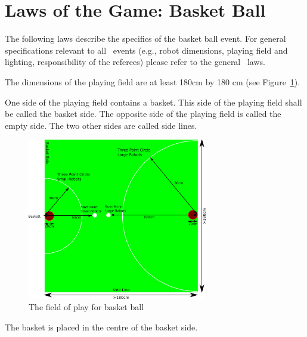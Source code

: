 \documentclass[12pt]{hurocup}
\begin{document}
\section{Laws of the Game: Basket Ball}
\label{sec:basket-ball-laws}

The following laws describe the specifics of the basket ball
event. For general specifications relevant to all \HuroCup\ events
(e.g., robot dimensions, playing field and lighting, responsibility of
the referees) please refer to the general \HuroCup\ laws.

\label{bb-field}

\begin{lawlist}[BB]

\item The dimensions of the playing field are at least 180cm by
  180 cm (see Figure~\ref{fig:field-basket-ball}).

\item One side of the playing field contains a basket. This side of the
  playing field shall be called the basket side. The opposite side of
  the playing field is called the empty side. The two other sides are
  called side lines.

  \begin{figure}
    \begin{center}
      \includegraphics[width=0.7\textwidth]{Figures/basket-ball}
    \end{center}
    \caption{The field of play for basket ball}
    \label{fig:field-basket-ball}
  \end{figure}

\item The basket is placed in the centre of the basket side.


\end{lawlist}
\end{document}
